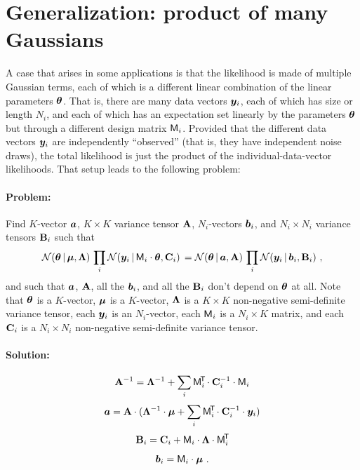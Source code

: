 \section{Generalization: product of many Gaussians}
\label{sec:generalization}

A case that arises in some applications is that the
likelihood is made of multiple Gaussian terms, each of which is a
different linear combination of the linear parameters $\boldsymbol{\theta}$.
That is, there are many data vectors $\boldsymbol{y}_i$, each of which has size or length $N_i$,
and each of which has an expectation
set linearly by the parameters $\boldsymbol{\theta}$ but through a different design matrix $\mathsf{M}_i$.
Provided that the different data vectors $\boldsymbol{y}_i$ are independently ``observed'' (that
is, they have independent noise draws), the total likelihood is just the product of
the individual-data-vector likelihoods.
That setup leads to the following problem:

\paragraph{Problem:}
Find $K$-vector $\boldsymbol{a}$, $K\times K$ variance tensor $\mathbf{A}$, $N_i$-vectors $\boldsymbol{b}_i$,
and $N_i\times N_i$ variance tensors $\mathbf{B}_i$ such that
\begin{equation}\label{eq:genproblem}
\mathcal{N}\!\,(\boldsymbol{\theta}\,|\,\boldsymbol{\mu},\mathbf{\Lambda})\,\prod_i\mathcal{N}\!\,(\boldsymbol{y}_i\,|\,\mathsf{M}_i\cdot\boldsymbol{\theta},\mathbf{C}_i)\,
 = \mathcal{N}\!\,(\boldsymbol{\theta}\,|\,\boldsymbol{a},\mathbf{A})\,\prod_i\mathcal{N}\!\,(\boldsymbol{y}_i\,|\,\boldsymbol{b}_i,\mathbf{B}_i) ~ ,
\end{equation}
and such that $\boldsymbol{a}$, $\mathbf{A}$, all the $\boldsymbol{b}_i$, and all the $\mathbf{B}_i$
don't depend on $\boldsymbol{\theta}$ at all.
Note that
$\boldsymbol{\theta}$ is a $K$-vector,
$\boldsymbol{\mu}$ is a $K$-vector,
$\mathbf{\Lambda}$ is a $K\times K$ non-negative semi-definite variance tensor,
each $\boldsymbol{y}_i$ is an $N_i$-vector,
each $\mathsf{M}_i$ is a $N_i\times K$ matrix,
and
each $\mathbf{C}_i$ is a $N_i\times N_i$ non-negative semi-definite variance tensor.

\paragraph{Solution:}

\begin{equation}\label{eq:genA}
\mathbf{A}^{-1} = \mathbf{\Lambda}^{-1} + \sum_i\mathsf{M}_i^{\!\mathsf{T}\!} \cdot \mathbf{C}_i^{-1} \cdot \mathsf{M}_i
\end{equation}
\begin{equation}\label{eq:gena}
\boldsymbol{a} = \mathbf{A} \cdot (\mathbf{\Lambda}^{-1} \cdot \boldsymbol{\mu} + \sum_i\mathsf{M}_i^{\!\mathsf{T}\!} \cdot \mathbf{C}_i^{-1} \cdot \boldsymbol{y}_i)
\end{equation}
\begin{equation}\label{eq:genB}
\mathbf{B}_i = \mathbf{C}_i + \mathsf{M}_i \cdot \mathbf{\Lambda} \cdot \mathsf{M}_i^{\!\mathsf{T}\!}
\end{equation}
\begin{equation}\label{eq:genb}
\boldsymbol{b}_i = \mathsf{M}_i \cdot \boldsymbol{\mu}
~ .
\end{equation}

